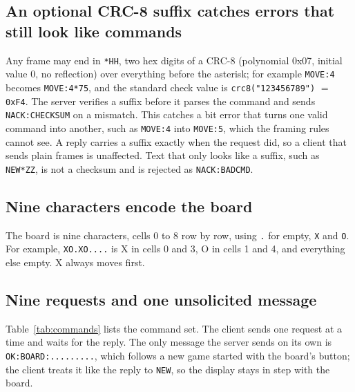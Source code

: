 \subsection{An optional CRC-8 suffix catches errors that still look like commands}
Any frame may end in \texttt{*HH}, two hex digits of a CRC-8 (polynomial 0x07,
initial value 0, no reflection) over everything before the asterisk; for example
\texttt{MOVE:4} becomes \texttt{MOVE:4*75}, and the standard check value is
\texttt{crc8("123456789")} $=$ \texttt{0xF4}. The server verifies a suffix
before it parses the command and sends \texttt{NACK:CHECKSUM} on a mismatch.
This catches a bit error that turns one valid command into another, such as
\texttt{MOVE:4} into \texttt{MOVE:5}, which the framing rules cannot see. A
reply carries a suffix exactly when the request did, so a client that sends
plain frames is unaffected. Text that only looks like a suffix, such as
\texttt{NEW*ZZ}, is not a checksum and is rejected as \texttt{NACK:BADCMD}.

\subsection{Nine characters encode the board}
The board is nine characters, cells 0 to 8 row by row, using \texttt{.} for
empty, \texttt{X} and \texttt{O}. For example, \texttt{XO.XO....} is X in cells
0 and 3, O in cells 1 and 4, and everything else empty. X always moves first.

\subsection{Nine requests and one unsolicited message}
Table~\ref{tab:commands} lists the command set. The client sends one request at
a time and waits for the reply. The only message the server sends on its own is
\texttt{OK:BOARD:.........}, which follows a new game started with the
board's button; the client treats it like the reply to \texttt{NEW}, so the
display stays in step with the board.

